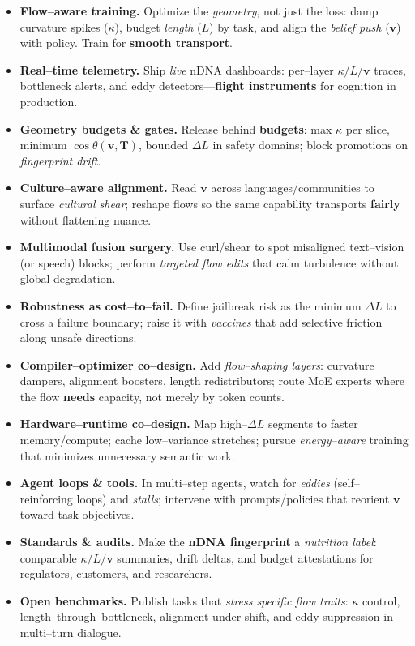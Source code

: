 \begin{itemize}[leftmargin=*,itemsep=0.45em]
  \item \textbf{Flow--aware training.} Optimize the \emph{geometry}, not just the loss: damp curvature spikes (\(\kappa\)), budget \emph{length} (\(L\)) by task, and align the \emph{belief push} (\(\mathbf{v}\)) with policy. Train for \textbf{smooth transport}.
  \item \textbf{Real--time telemetry.} Ship \emph{live} nDNA dashboards: per--layer \(\kappa/L/\mathbf{v}\) traces, bottleneck alerts, and eddy detectors—\textbf{flight instruments} for cognition in production.
  \item \textbf{Geometry budgets \& gates.} Release behind \textbf{budgets}: max \(\kappa\) per slice, minimum \(\cos\theta(\mathbf{v},\mathbf{T})\), bounded \(\Delta L\) in safety domains; block promotions on \emph{fingerprint drift}.
  \item \textbf{Culture--aware alignment.} Read \(\mathbf{v}\) across languages/communities to surface \emph{cultural shear}; reshape flows so the same capability transports \textbf{fairly} without flattening nuance.
  \item \textbf{Multimodal fusion surgery.} Use curl/shear to spot misaligned text--vision (or speech) blocks; perform \emph{targeted flow edits} that calm turbulence without global degradation.
  \item \textbf{Robustness as cost--to--fail.} Define jailbreak risk as the minimum \(\Delta L\) to cross a failure boundary; raise it with \emph{vaccines} that add selective friction along unsafe directions.
  \item \textbf{Compiler--optimizer co--design.} Add \emph{flow--shaping layers}: curvature dampers, alignment boosters, length redistributors; route MoE experts where the flow \textbf{needs} capacity, not merely by token counts.
  \item \textbf{Hardware--runtime co--design.} Map high--\(\Delta L\) segments to faster memory/compute; cache low--variance stretches; pursue \emph{energy--aware} training that minimizes unnecessary semantic work.
  \item \textbf{Agent loops \& tools.} In multi--step agents, watch for \emph{eddies} (self--reinforcing loops) and \emph{stalls}; intervene with prompts/policies that reorient \(\mathbf{v}\) toward task objectives.
  \item \textbf{Standards \& audits.} Make the \textbf{nDNA fingerprint} a \emph{nutrition label}: comparable \(\kappa/L/\mathbf{v}\) summaries, drift deltas, and budget attestations for regulators, customers, and researchers.
  \item \textbf{Open benchmarks.} Publish tasks that \emph{stress specific flow traits}: \(\kappa\) control, length--through--bottleneck, alignment under shift, and eddy suppression in multi--turn dialogue.


\end{itemize}
